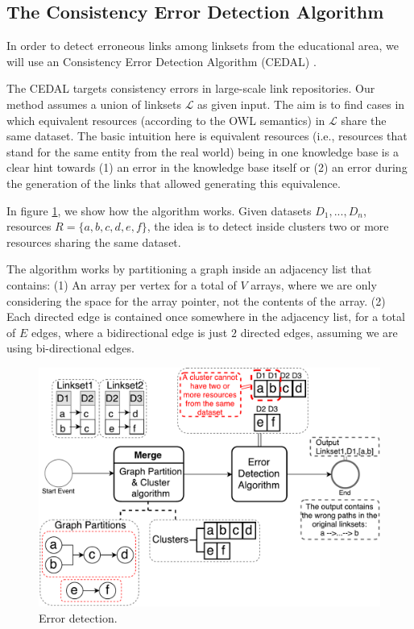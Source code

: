 
\subsection{The Consistency Error Detection Algorithm}

In order to detect erroneous links among linksets from the educational area, we will use an Consistency Error Detection Algorithm (CEDAL) \cite{cedal2017}.

The CEDAL targets consistency errors in large-scale link repositories. Our method assumes a union of linksets $\mathcal{L}$ as given input. The aim is to find cases in which equivalent resources (according to the OWL semantics) in $\mathcal{L}$ share the same dataset. The basic intuition here is equivalent resources (i.e., resources that stand for the same entity from the real world) being in one knowledge base is a clear hint towards (1) an error in the knowledge base itself or (2) an error during the generation of the links that allowed generating this equivalence.

In figure \ref{fig:ErrorDetection}, we show how the algorithm works. Given datasets $D_1,...,D_n$, resources $R=\{a,b,c,d,e,f\}$, the idea is to detect inside clusters two or more resources sharing the same dataset.

The algorithm works by partitioning a graph inside an adjacency list that contains: (1) An array per vertex for a total of $V$ arrays, where we are only considering the space for the array pointer, not the contents of the array. (2) Each directed edge is contained once somewhere in the adjacency list, for a total of $E$ edges, where a bidirectional edge is just $2$ directed edges, assuming we are using bi-directional edges. %


\begin{figure}[htb] 
	\centering
	\includegraphics[width=0.86\linewidth]{img/errorDetection8.pdf}
	\caption{Error detection.}
	\label{fig:ErrorDetection}
\end{figure} 


